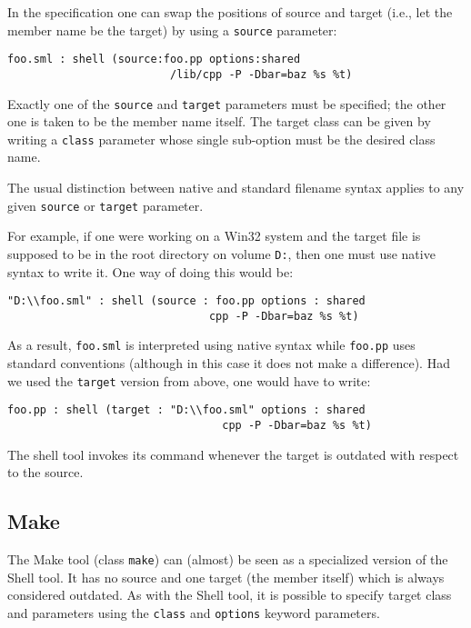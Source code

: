 In the specification one can swap the positions of source and target
(i.e., let the member name be the target) by using a {\tt source}
parameter:

\begin{lstlisting}[language=CM]
  foo.sml : shell (source:foo.pp options:shared
                         /lib/cpp -P -Dbar=baz %s %t)
\end{lstlisting}%

Exactly one of the {\tt source} and {\tt target} parameters must be
specified; the other one is taken to be the member name itself.  The
target class can be given by writing a {\tt class} parameter whose
single sub-option must be the desired class name.

The usual distinction between native and standard filename syntax
applies to any given {\tt source} or {\tt target} parameter.

For example, if one were working on a Win32 system and the target file
is supposed to be in the root directory on volume {\tt D:},
then one must use native syntax to write it.  One way of doing this
would be:

\begin{lstlisting}[language=CM]
  "D:\\foo.sml" : shell (source : foo.pp options : shared
                               cpp -P -Dbar=baz %s %t)
\end{lstlisting}%

\noindent As a result, {\tt foo.sml} is interpreted using native
syntax while {\tt foo.pp} uses standard conventions (although in this
case it does not make a difference).  Had we used the {\tt target}
version from above, one would have to write:

\begin{lstlisting}[language=CM]
  foo.pp : shell (target : "D:\\foo.sml" options : shared
                                 cpp -P -Dbar=baz %s %t)
\end{lstlisting}%

The shell tool invokes its command whenever the target is outdated
with respect to the source.

\subsection{Make}

The Make tool (class {\tt make}) can (almost) be seen as a specialized
version of the Shell tool.  It has no source and one target (the
member itself) which is always considered outdated.  As with the Shell
tool, it is possible to specify target class and parameters using the
{\tt class} and {\tt options} keyword parameters.

